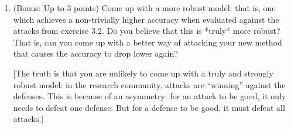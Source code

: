 \documentclass[10pt,letter,notitlepage]{article}
\newcounter{exercise}
\begin{document}
\begin{exercise}
\begin{enumerate}
    
  \item (Bonus: Up to 3 points) Come up with a more robust model: that is, one which achieves a non-trivially higher accuracy when evaluated against the attacks from exercise 3.2. Do you believe that this is *truly* more robust? That is, can you come up with a better way of attacking your new method that causes the accuracy to drop lower again?

    [The truth is that you are unlikely to come up with a truly and strongly robust model: in the research community, attacks are ``winning'' against the defenses. This is because of an asymmetry: for an attack to be good, it only needs to defeat one defense. But for a defense to be good, it must defeat all attacks.]
	\end{enumerate}

\end{exercise}
\end{document}

